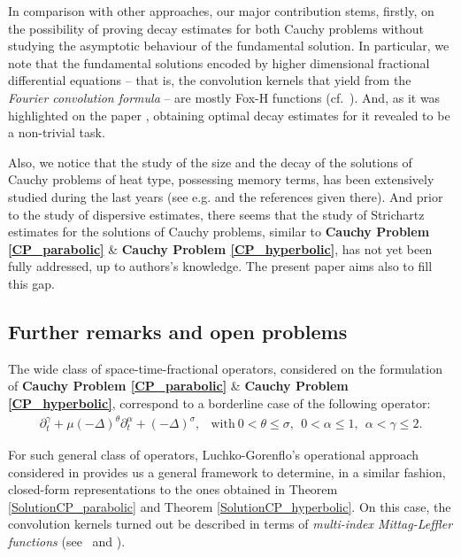 \documentclass{amsart}
\theoremstyle{definition}
\theoremstyle{remark}
\numberwithin{equation}{section}
\begin{document}
{			
			In comparison with other approaches, our major contribution stems, firstly, on the possibility of proving decay estimates for both Cauchy problems without studying the asymptotic behaviour of the fundamental solution. In particular, we note that the fundamental solutions encoded by higher dimensional fractional differential equations -- that is, the convolution kernels that yield from the {\it Fourier convolution formula} -- are mostly Fox-H functions (cf.~\cite[Subsection 1.12]{KST06}). And, as it was highlighted on the paper \cite{KSZ17}, obtaining optimal decay estimates for it revealed to be a non-trivial task.
			
			Also, we notice that the study of the size and the decay of the solutions of Cauchy problems of heat type, possessing memory terms, has been extensively studied during the last years (see e.g. \cite{KSVZ16,CQW21} and the references given there). And prior to the study of dispersive estimates, there seems that the study of Strichartz estimates for the solutions of Cauchy problems, similar to {\bf Cauchy Problem \ref{CP_parabolic}} \& {\bf Cauchy Problem \ref{CP_hyperbolic}}, has not yet been fully addressed, up to authors's knowledge. The present paper aims also to fill this gap.
			\newpage
			
			
			\subsection{Further remarks and open problems}
			
			The wide class of space-time-fractional operators, considered on the formulation of {\bf Cauchy Problem \ref{CP_parabolic}} \& {\bf Cauchy Problem \ref{CP_hyperbolic}}, correspond to a borderline case of the following operator:
			\begin{eqnarray}
				\label{SpaceTimeFractional}	\partial_t^{\gamma}+\mu (-\Delta)^\theta \partial_t^\alpha +(-\Delta)^\sigma,&\mbox{with}~0<\theta\leq \sigma,~~ 0<\alpha\leq 1,~~ \alpha<\gamma \leq 2. 
			\end{eqnarray}
			
			For such general class of operators, Luchko-Gorenflo's operational approach considered in \cite{luchko1999operational} provides us a general framework to determine, in a similar fashion, closed-form representations to the ones obtained in Theorem \ref{SolutionCP_parabolic} and Theorem \ref{SolutionCP_hyperbolic}. On this case, the convolution kernels turned out be described in terms of {\it multi-index Mittag-Leffler functions} (see~\cite[Theorem 4.1]{luchko1999operational} and \cite[eq.~(46)]{luchko1999operational}). 
			
}
\end{document}
